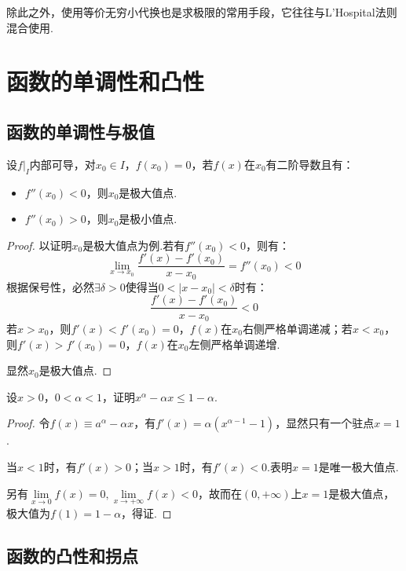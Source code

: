 除此之外，使用等价无穷小代换也是求极限的常用手段，它往往与L'Hospital法则混合使用.


\section{函数的单调性和凸性}
\subsection{函数的单调性与极值}
\begin{theorem}
    设$\left.f\right|_{I}$内部可导，对$x_0 \in I$，$f(x_0)=0$，若$f(x)$在$x_0$有二阶导数且有：
    \begin{itemize}
        \item $f''(x_0)<0$，则$x_0$是极大值点.
        \item $f''(x_0)>0$，则$x_0$是极小值点.
    \end{itemize}
\end{theorem}

\begin{proof}
    以证明$x_0$是极大值点为例.若有$f''(x_0)<0$，则有：
    \[\lim_{x \to x_0}\frac{f'(x)-f'(x_0)}{x-x_0} = f''(x_0) < 0\]
    根据保号性，必然$\exists \delta > 0$使得当$0<|x-x_0|<\delta$时有：
    \[\frac{f'(x)-f'(x_0)}{x-x_0} < 0\]
    若$x>x_0$，则$f'(x)<f'(x_0)=0$，$f(x)$在$x_0$右侧严格单调递减；若$x<x_0$，则$f'(x)>f'(x_0)=0$，$f(x)$在$x_0$左侧严格单调递增.
    
    显然$x_0$是极大值点.
\end{proof}

\begin{question}
    设$x>0$，$0<\alpha<1$，证明$x^\alpha - \alpha x \leqslant 1 - \alpha$.
\end{question}

\begin{proof}
    令$f(x) \equiv a^\alpha-\alpha x$，有$f'(x)=\alpha(x^{\alpha-1}-1)$，显然只有一个驻点$x=1$.

    当$x<1$时，有$f'(x)>0$；当$x>1$时，有$f'(x)<0$.表明$x=1$是唯一极大值点.
    
    另有$\lim\limits_{x \to 0}f(x)=0,\lim\limits_{x \to +\infty}f(x)<0$，故而在$(0,+\infty)$上$x=1$是极大值点，极大值为$f(1)=1-\alpha$，得证.
\end{proof}


\subsection{函数的凸性和拐点}
